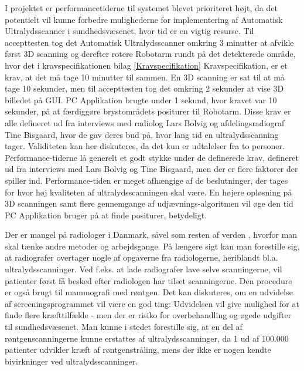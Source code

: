 I projektet er performancetiderne til systemet blevet prioriteret højt, da det potentielt vil kunne forbedre mulighederne for implementering af Automatisk Ultralydsscanner i sundhedsvæsenet, hvor tid er en vigtig resurse. Til accepttesten tog det Automatisk Ultralydsscanner omkring 3 minutter at afvikle først 3D scanning og derefter rotere Robotarm rundt på det detekterede område, hvor det i kravspecifikationen bilag \ref{Kravspecifikation} Kravspecifikation, er et krav, at det må tage 10 minutter til sammen. En 3D scanning er sat til at må tage 10 sekunder, men til accepttesten tog det omkring 2 sekunder at vise 3D billedet på GUI. PC Applikation brugte under 1 sekund, hvor kravet var 10 sekunder, på at færdiggøre brystområdets positurer til Robotarm. Disse krav er alle defineret ud fra interviews med radiolog Lars Bolvig og afdelingsradiograf Tine Bisgaard, hvor de gav deres bud på, hvor lang tid en ultralydsscanning tager. Validiteten kan her diskuteres, da det kun er udtalelser fra to personer.
Performance-tiderne lå generelt et godt stykke under de definerede krav, defineret ud fra interviews med Lars Bolvig og  Tine Bisgaard, men der er flere faktorer der spiller ind. Performance-tiden er meget afhængige af de beslutninger, der tages for hvor høj kvaliteten af ultralydsscanningen skal være. En højere opløsning på 3D scanningen samt flere gennemgange af udjævnings-algoritmen vil øge den tid PC Applikation bruger på at finde positurer, betydeligt.  

Der er mangel på radiologer i Danmark, såvel som resten af verden \cite{Lagemangel}, hvorfor man skal tænke andre metoder og arbejdsgange. På længere sigt kan man forestille sig, at radiografer overtager nogle af opgaverne fra radiologerne, heriblandt bl.a. ultralydsscanninger. Ved f.eks. at lade radiografer lave selve scanningerne, vil patienter først få besked efter radiologen har tilset scanningerne. Den procedure er også brugt til mammografi med røntgen. Det kan diskuteres, om en udvidelse af screeningsprogrammet vil være en god ting: Udvidelsen vil give mulighed for at finde flere kræfttilfælde - men der er risiko for overbehandling og øgede udgifter til sundhedsvæsenet. Man kunne i stedet forestille sig, at en del af røntgenscanningerne kunne erstattes af ultralydsscanninger, da 1 ud af 100.000 \cite{RiskRontgen} patienter udvikler kræft af røntgenstråling, mens der ikke er nogen kendte bivirkninger ved ultralydsscanninger.


